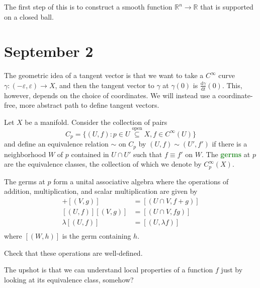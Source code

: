 \documentclass[11pt]{scrartcl}
\newcommand{\dd}{\mathrm{d}}
\providecommand{\eps}{\varepsilon}
\providecommand{\RR}{\mathbb R}
\providecommand{\vocab}[1]{{\textbf{\textcolor{ForestGreen}{#1}}}}
\begin{document}
The first step of this is to construct a smooth function $\RR^n\to\RR$
that is supported on a closed ball.

\pagebreak

\section{September 2}\label{sec:sep2}



The geometric idea of a tangent vector
is that we want to take a $C^\infty$ curve
$\gamma\colon(-\eps,\eps)\to X$,
and then the tangent vector to $\gamma$ at $\gamma(0)$ is
$\frac{\dd\gamma}{\dd t}(0)$.
This, however, depends on the choice of coordinates.
We will instead use a coordinate-free, more abstract path
to define tangent vectors.

\begin{definition}
    \label{def:germs}
    Let $X$ be a manifold. Consider the collection of pairs
    \begin{equation*}
	C_p = \{ (U,f) : p\in U\overset{\text{open}}\subseteq X,
	f\in C^\infty(U)\}
    \end{equation*}
    and define an equivalence relation $\sim$ on $C_p$ by
    $(U,f)\sim(U',f')$ if there is a neighborhood $W$ of $p$
    contained in $U\cap U'$ such that $f \equiv f'$ on $W$.
    The \vocab{germs} at $p$ are the equivalence classes,
    the collection of which we denote by $C^\infty_p(X)$.
\end{definition}

The germs at $p$ form a unital associative algebra
where the operations of addition, multiplication, and scalar multiplication
are given by
\begin{align*}
    [(U,f)] + [(V,g)] &= [(U\cap V, f+g)]\\
    [(U,f)][(V,g)] &= [(U\cap V, fg)]\\
    \lambda[(U,f)] &= [(U, \lambda f)]\\
\end{align*}
where $[(W,h)]$ is the germ containing $h$.

\begin{exercise}
    Check that these operations are well-defined.
\end{exercise}

The upshot is that we can understand local properties of a function $f$
just by looking at its equivalence class, somehow?
\end{document}
